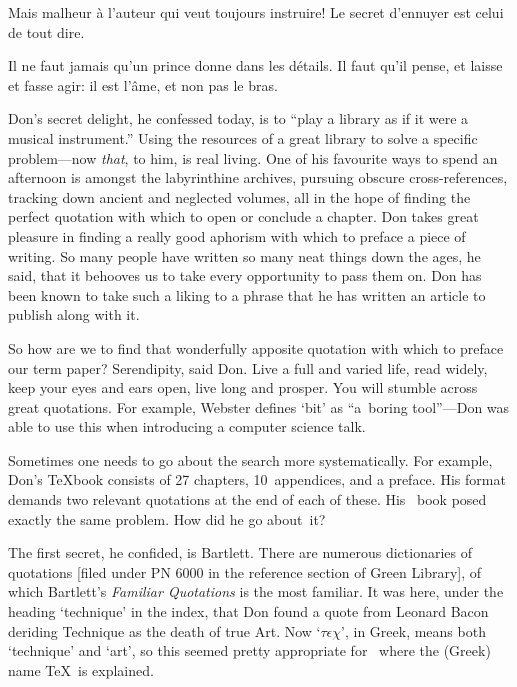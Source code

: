 
\smallskip
{\narrower\smallskip\noindent
	Mais malheur \`a l'auteur qui veut toujours instruire!
	Le secret d'ennuyer est celui de tout dire.
\smallskip}


\smallskip
{\narrower\smallskip\noindent
	Il ne faut jamais qu'un prince donne dans les d\'etails.
	Il faut qu'il pense, et laisse et fasse agir:
	il est l'\^ame, et non pas le bras.
\smallskip}


\medskip
\noindent
Don's secret delight, he confessed today, is to ``play a library as if
it were a musical instrument.'' Using the resources of a great library
to solve a specific problem---now {\it  that}, to him, is real living.
One of his favourite ways to spend an afternoon is amongst the
labyrinthine archives, pursuing obscure cross-references, tracking down
ancient and neglected volumes, all in the hope of finding the perfect
quotation with which to open or conclude a chapter. Don takes great
pleasure in finding a really good aphorism with which to preface a
piece of writing.  So many people have written so many neat things
down the ages, he said, that it behooves us to take every opportunity
to pass them on. Don has been known to take such a liking to a phrase
that he has written an article to publish along with it.

So how are we to find that wonderfully apposite quotation with which to
preface our term paper? Serendipity, said Don. Live a full and varied
life, read widely, keep your eyes and ears open, live long and prosper.
You will stumble across great quotations. For example, Webster defines
`bit' as ``a~boring tool''---Don was able to use this when
introducing a computer science talk.

Sometimes one needs to go about the search more systematically. For
example, Don's \TeX book consists of 27 chapters, 10~appendices, and a
preface. His format demands two relevant quotations at the end of each
of these. His \MF\ book  posed exactly the same problem. How did he go
about~it?

The first secret, he confided, is Bartlett. There are numerous
dictionaries of quotations [filed under PN 6000 in the reference
section of Green Library], of which Bartlett's {\sl Familiar Quotations\/} is
the most familiar. It was here, under the heading `technique'
in the index, that
Don found a quote from Leonard Bacon deriding Technique as the death
of true Art. 
Now `$\tau\epsilon\chi$',
in Greek, means both `technique' and
`art', so this seemed pretty appropriate for  \TeXbook\ where the (Greek)
name \TeX\ is explained.

